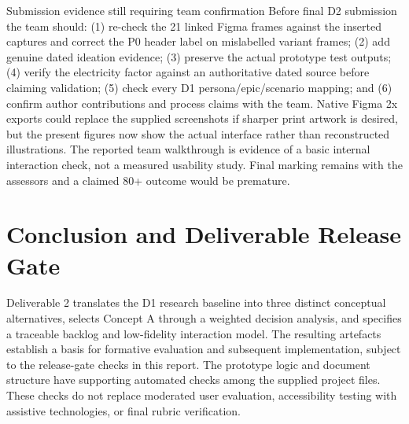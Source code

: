 \documentclass[12pt,a4paper]{article}
\begin{document}
\begin{cautionbox}{Submission evidence still requiring team confirmation}
Before final D2 submission the team should: (1) re-check the 21 linked Figma frames against the inserted captures and correct the P0 header label on mislabelled variant frames; (2) add genuine dated ideation evidence; (3) preserve the actual prototype test outputs; (4) verify the electricity factor against an authoritative dated source before claiming validation; (5) check every D1 persona/epic/scenario mapping; and (6) confirm author contributions and process claims with the team. Native Figma 2x exports could replace the supplied screenshots if sharper print artwork is desired, but the present figures now show the actual interface rather than reconstructed illustrations. The reported team walkthrough is evidence of a basic internal interaction check, not a measured usability study. Final marking remains with the assessors and a claimed 80+ outcome would be premature.
\end{cautionbox}

\section{Conclusion and Deliverable Release Gate}

Deliverable 2 translates the D1 research baseline into three distinct conceptual alternatives, selects Concept A through a weighted decision analysis, and specifies a traceable backlog and low-fidelity interaction model. The resulting artefacts establish a basis for formative evaluation and subsequent implementation, subject to the release-gate checks in this report. The prototype logic and document structure have supporting automated checks among the supplied project files. These checks do not replace moderated user evaluation, accessibility testing with assistive technologies, or final rubric verification.
\end{document}
